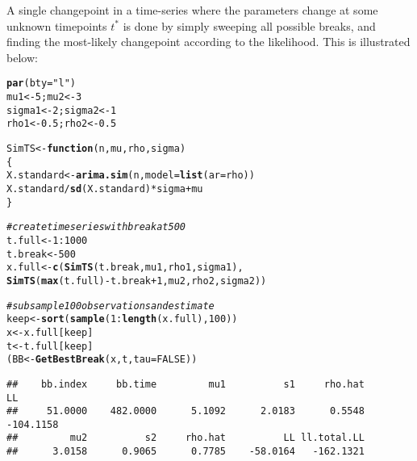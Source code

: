 \documentclass[10pt]{article}\usepackage[]{graphicx}\usepackage[]{color}
\makeatletter
\newcommand{\hlnum}[1]{\textcolor[rgb]{0.686,0.059,0.569}{#1}}%
\newcommand{\hlstr}[1]{\textcolor[rgb]{0.192,0.494,0.8}{#1}}%
\newcommand{\hlcom}[1]{\textcolor[rgb]{0.678,0.584,0.686}{\textit{#1}}}%
\newcommand{\hlopt}[1]{\textcolor[rgb]{0,0,0}{#1}}%
\newcommand{\hlstd}[1]{\textcolor[rgb]{0.345,0.345,0.345}{#1}}%
\newcommand{\hlkwa}[1]{\textcolor[rgb]{0.161,0.373,0.58}{\textbf{#1}}}%
\newcommand{\hlkwb}[1]{\textcolor[rgb]{0.69,0.353,0.396}{#1}}%
\newcommand{\hlkwc}[1]{\textcolor[rgb]{0.333,0.667,0.333}{#1}}%
\newcommand{\hlkwd}[1]{\textcolor[rgb]{0.737,0.353,0.396}{\textbf{#1}}}%
\newenvironment{kframe}{%
 \def\at@end@of@kframe{}%
 \ifinner\ifhmode%
  \def\at@end@of@kframe{\end{minipage}}%
  \begin{minipage}{\columnwidth}%
 \fi\fi%
 \def\FrameCommand##1{\hskip\@totalleftmargin \hskip-\fboxsep
 \colorbox{shadecolor}{##1}\hskip-\fboxsep
     \hskip-\linewidth \hskip-\@totalleftmargin \hskip\columnwidth}%
 \MakeFramed {\advance\hsize-\width
   \@totalleftmargin\z@ \linewidth\hsize
   \@setminipage}}%
 {\par\unskip\endMakeFramed%
 \at@end@of@kframe}
\newenvironment{knitrout}{}{} %
\makeatother
\begin{document}
A single changepoint in a time-series where the parameters change at some unknown timepoints $t^*$ is done by simply sweeping all possible breaks, and finding the most-likely changepoint according to the likelihood.  This is illustrated below:

\begin{knitrout}
\color{fgcolor}\begin{kframe}
\begin{alltt}
\hlkwd{par}\hlstd{(}\hlkwc{bty}\hlstd{=}\hlstr{"l"}\hlstd{)}
\hlstd{mu1} \hlkwb{<-} \hlnum{5}\hlstd{; mu2} \hlkwb{<-} \hlnum{3}
\hlstd{sigma1} \hlkwb{<-} \hlnum{2}\hlstd{; sigma2} \hlkwb{<-} \hlnum{1}
\hlstd{rho1} \hlkwb{<-} \hlnum{0.5}\hlstd{; rho2} \hlkwb{<-} \hlnum{0.5}

\hlstd{SimTS} \hlkwb{<-} \hlkwa{function}\hlstd{(}\hlkwc{n}\hlstd{,} \hlkwc{mu}\hlstd{,} \hlkwc{rho}\hlstd{,} \hlkwc{sigma}\hlstd{)}
\hlstd{\{}
  \hlstd{X.standard} \hlkwb{<-} \hlkwd{arima.sim}\hlstd{(n,} \hlkwc{model}\hlstd{=}\hlkwd{list}\hlstd{(}\hlkwc{ar} \hlstd{= rho))}
  \hlstd{X.standard}\hlopt{/}\hlkwd{sd}\hlstd{(X.standard)}\hlopt{*}\hlstd{sigma} \hlopt{+} \hlstd{mu}
\hlstd{\}}

\hlcom{# create time series with break at 500}
\hlstd{t.full} \hlkwb{<-} \hlnum{1}\hlopt{:}\hlnum{1000}
\hlstd{t.break} \hlkwb{<-} \hlnum{500}
\hlstd{x.full} \hlkwb{<-} \hlkwd{c}\hlstd{(}\hlkwd{SimTS}\hlstd{(t.break, mu1, rho1, sigma1),}
            \hlkwd{SimTS}\hlstd{(}\hlkwd{max}\hlstd{(t.full)}\hlopt{-}\hlstd{t.break}\hlopt{+}\hlnum{1}\hlstd{, mu2, rho2, sigma2))}

\hlcom{# subsample 100 observations and estimate}
\hlstd{keep} \hlkwb{<-} \hlkwd{sort}\hlstd{(}\hlkwd{sample}\hlstd{(}\hlnum{1}\hlopt{:}\hlkwd{length}\hlstd{(x.full),} \hlnum{100}\hlstd{))}
\hlstd{x} \hlkwb{<-} \hlstd{x.full[keep]}
\hlstd{t} \hlkwb{<-} \hlstd{t.full[keep]}
\hlstd{(BB} \hlkwb{<-} \hlkwd{GetBestBreak}\hlstd{(x,t,} \hlkwc{tau}\hlstd{=}\hlnum{FALSE}\hlstd{))}
\end{alltt}
\begin{verbatim}
##    bb.index     bb.time         mu1          s1     rho.hat          LL 
##     51.0000    482.0000      5.1092      2.0183      0.5548   -104.1158 
##         mu2          s2     rho.hat          LL ll.total.LL 
##      3.0158      0.9065      0.7785    -58.0164   -162.1321
\end{verbatim}
\end{kframe}
\end{knitrout}
\end{document}
